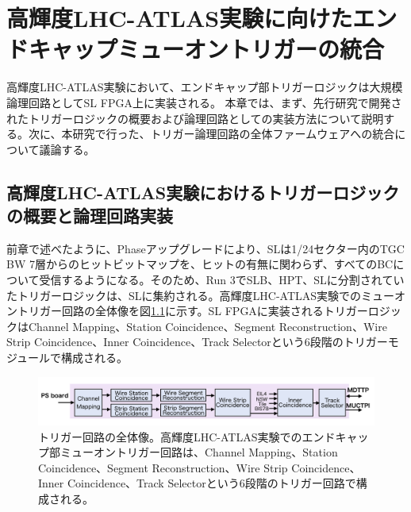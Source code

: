 \chapter{高輝度LHC-ATLAS実験に向けたエンドキャップミューオントリガーの統合}
\label{chap_TriggerIntegration}
高輝度LHC-ATLAS実験において、エンドキャップ部トリガーロジックは大規模論理回路としてSL FPGA上に実装される。
本章では、まず、先行研究で開発されたトリガーロジックの概要および論理回路としての実装方法について説明する。次に、本研究で行った、トリガー論理回路の全体ファームウェアへの統合について議論する。

\section{高輝度LHC-ATLAS実験におけるトリガーロジックの概要と論理回路実装}
\label{sec_Phase2TriggerLogic}
前章で述べたように、Phase\two アップグレードにより、SLは1/24セクター内のTGC BW 7層からのヒットビットマップを、ヒットの有無に関わらず、すべてのBCについて受信するようになる。そのため、Run 3でSLB、HPT、SLに分割されていたトリガーロジックは、SLに集約される。高輝度LHC-ATLAS実験でのミューオントリガー回路の全体像を図\ref{Trigger_over}に示す。SL FPGAに実装されるトリガーロジックはChannel Mapping、Station Coincidence、Segment Reconstruction、Wire Strip Coincidence、Inner Coincidence、Track Selectorという6段階のトリガーモジュールで構成される。

\begin{figure} 
\centering
\includegraphics[width=16cm]{fig/SL/Trigger_over.png}
\caption[トリガー回路の全体像]{トリガー回路の全体像。高輝度LHC-ATLAS実験でのエンドキャップ部ミューオントリガー回路は、Channel Mapping、Station Coincidence、Segment Reconstruction、Wire Strip Coincidence、Inner Coincidence、Track Selectorという6段階のトリガー回路で構成される。}
\label{Trigger_over}
\end{figure}

